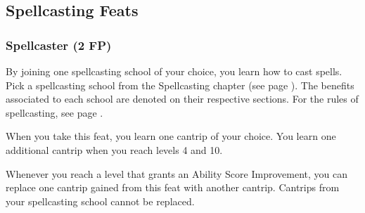 \subsection*{Spellcasting Feats}




\subsubsection{Spellcaster (2 FP)}
    By joining one spellcasting school of your choice, you learn how to cast spells.
    Pick a spellcasting school from the Spellcasting chapter (see page \pageref{ch::spellcasting}).
    The benefits associated to each school are denoted on their respective sections.
    For the rules of spellcasting, see page \pageref{sec::spellcastingrules}.

    When you take this feat, you learn one cantrip of your choice.
    You learn one additional cantrip when you reach levels 4 and 10.

    Whenever you reach a level that grants an Ability Score Improvement, you can replace one cantrip gained from this feat with another cantrip.
    Cantrips from your spellcasting school cannot be replaced.
